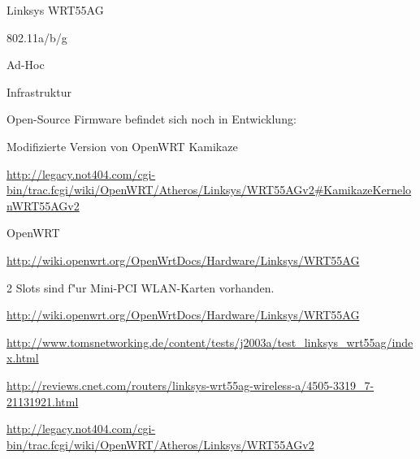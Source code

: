 %
%
\begin{wlandevice}{Linksys WRT55AG}


\begin{wlanieeestandard}
\item 802.11a/b/g
\end{wlanieeestandard}

\begin{wlanmode}
\item Ad-Hoc
\item Infrastruktur
\end{wlanmode}

\begin{wlanfirmware}
\item
Open-Source Firmware befindet sich noch in Entwicklung:

Modifizierte Version von OpenWRT Kamikaze

\url{http://legacy.not404.com/cgi-bin/trac.fcgi/wiki/OpenWRT/Atheros/Linksys/WRT55AGv2#KamikazeKernelonWRT55AGv2}

OpenWRT

\url{http://wiki.openwrt.org/OpenWrtDocs/Hardware/Linksys/WRT55AG}
\end{wlanfirmware}


\begin{wlanextrainfo}
\item
2 Slots sind f"ur Mini-PCI WLAN-Karten vorhanden.
\end{wlanextrainfo}

\begin{wlanlink}
\item \url{http://wiki.openwrt.org/OpenWrtDocs/Hardware/Linksys/WRT55AG}
\item \url{http://www.tomsnetworking.de/content/tests/j2003a/test_linksys_wrt55ag/index.html}
\item \url{http://reviews.cnet.com/routers/linksys-wrt55ag-wireless-a/4505-3319_7-21131921.html}
\item \url{http://legacy.not404.com/cgi-bin/trac.fcgi/wiki/OpenWRT/Atheros/Linksys/WRT55AGv2}
\end{wlanlink}

\end{wlandevice}

